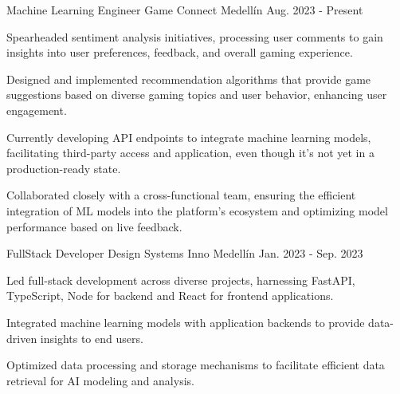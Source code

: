 \newcommand{\quotes}[1]{``#1''}

\begin{cventries}
\cventry
{Machine Learning Engineer} %
{Game Connect} %
{Medellín} %
{Aug. 2023 - Present} %
{
  \begin{cvitems} %
    \item {Spearheaded sentiment analysis initiatives, processing user comments to gain insights into user preferences, feedback, and overall gaming experience.}
    \item {Designed and implemented recommendation algorithms that provide game suggestions based on diverse gaming topics and user behavior, enhancing user engagement.}
    \item {Currently developing API endpoints to integrate machine learning models, facilitating third-party access and application, even though it's not yet in a production-ready state.}
    \item {Collaborated closely with a cross-functional team, ensuring the efficient integration of ML models into the platform's ecosystem and optimizing model performance based on live feedback.}
  \end{cvitems}
}
\cventry
{FullStack Developer} %
{Design Systems Inno} %
{Medellín} %
{Jan. 2023 - Sep. 2023} %
{
  \begin{cvitems} %
    \item {Led full-stack development across diverse projects, harnessing FastAPI, TypeScript, Node for backend and React for frontend applications.}
    \item {Integrated machine learning models with application backends to provide data-driven insights to end users.}
    \item {Optimized data processing and storage mechanisms to facilitate efficient data retrieval for AI modeling and analysis.}
  \end{cvitems}
}


\end{cventries}
